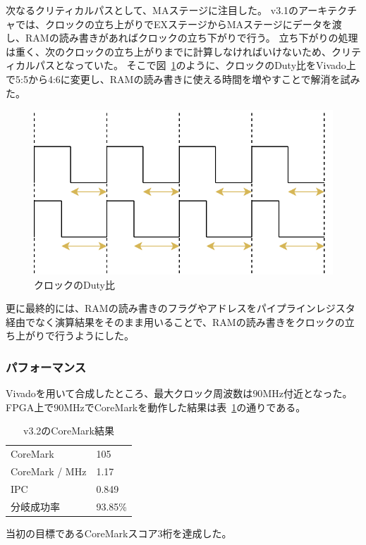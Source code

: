 \documentclass[dvipdfmx,10pt,a4paper,titlepage]{jsarticle}
\begin{document}
    次なるクリティカルパスとして、MAステージに注目した。
    v3.1のアーキテクチャでは、クロックの立ち上がりでEXステージからMAステージにデータを渡し、RAMの読み書きがあればクロックの立ち下がりで行う。
    立ち下がりの処理は重く、次のクロックの立ち上がりまでに計算しなければいけないため、クリティカルパスとなっていた。
    そこで図~\ref{fig:clkduty}のように、クロックのDuty比をVivado上で5:5から4:6に変更し、RAMの読み書きに使える時間を増やすことで解消を試みた。
    \begin{figure}[h]
        \centering
        \includegraphics[width=12cm]{figure/clock_duty.png}
        \caption{クロックのDuty比}\label{fig:clkduty}
    \end{figure}
    更に最終的には、RAMの読み書きのフラグやアドレスをパイプラインレジスタ経由でなく演算結果をそのまま用いることで、RAMの読み書きをクロックの立ち上がりで行うようにした。
    \subsubsection{パフォーマンス}
    Vivadoを用いて合成したところ、最大クロック周波数は$90\mathrm{MHz}$付近となった。
    FPGA上で$90\mathrm{MHz}$でCoreMarkを動作した結果は表~\ref{tab:v3.2}の通りである。
    \begin{table}[h]
        \begin{center}
            \caption{v3.2のCoreMark結果}\label{tab:v3.2}
            \begin{tabular}{ll}
                CoreMark & 105\\
                CoreMark / MHz & 1.17 \\
                IPC & 0.849 \\
                分岐成功率 & 93.85\% \\
            \end{tabular}
        \end{center}
    \end{table}
    当初の目標であるCoreMarkスコア3桁を達成した。
\end{document}
